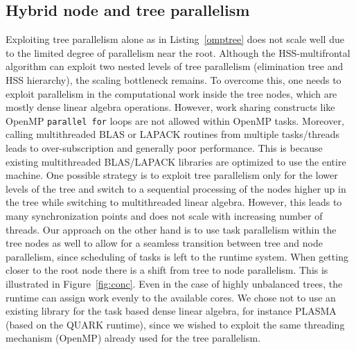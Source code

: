\documentclass{article}
\begin{document}
\subsection{Hybrid node and tree parallelism}
Exploiting tree parallelism alone as in Listing~\ref{omptree} does not
scale well due to the limited degree of parallelism near the
root. Although the HSS-multifrontal algorithm can exploit two nested
levels of tree parallelism (elimination tree and HSS hierarchy), the
scaling bottleneck remains. To overcome this, one needs to exploit
parallelism in the computational work inside the tree nodes, which are
mostly dense linear algebra operations. However, work sharing
constructs like OpenMP \verb+parallel for+ loops are not allowed
within OpenMP tasks. Moreover, calling multithreaded BLAS or LAPACK
routines from multiple tasks/threads leads to over-subscription and
generally poor performance. This is because existing multithreaded
BLAS/LAPACK libraries are optimized to use the entire machine. One
possible strategy is to exploit tree parallelism only for the lower
levels of the tree and switch to a sequential processing of the nodes
higher up in the tree while switching to multithreaded linear
algebra. However, this leads to many synchronization points and does
not scale with increasing number of threads. Our approach on the other
hand is to use task parallelism within the tree nodes as well to allow
for a seamless transition between tree and node parallelism, since
scheduling of tasks is left to the runtime system. When getting closer
to the root node there is a shift from tree to node parallelism. This
is illustrated in Figure~\ref{fig:conc}. Even in the case of highly
unbalanced trees, the runtime can assign work evenly to the available
cores.  We chose not to use an existing library for the task based
dense linear algebra, for instance PLASMA (based on the QUARK
runtime), since we wished to exploit the same threading mechanism
(OpenMP) already used for the tree parallelism.
\end{document}
